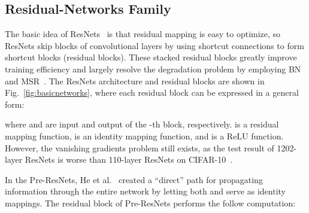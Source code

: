 \documentclass[journal]{IEEEtran}
\begin{document}
\subsection{Residual-Networks Family}
The basic idea of ResNets~\cite{he2015resnets} is that residual mapping is easy to optimize, so ResNets skip blocks of convolutional layers by using shortcut connections to form shortcut blocks (residual blocks). These stacked residual blocks greatly improve training efficiency and largely resolve the degradation problem by employing BN~\cite{ioffe2015bn} and MSR~\cite{he2015prelu}. The ResNets architecture and residual blocks are shown in Fig.~\ref{fig:basicnetworks}, where each residual block can be expressed in a general form:

where  and  are input and output of the -th block, respectively.  is a residual mapping function,  is an identity mapping function, and  is a ReLU function. However, the vanishing gradients problem still exists, as the test result of 1202-layer ResNets is worse than 110-layer ResNets on CIFAR-10~\cite{he2015resnets}. 
\par 
In the Pre-ResNets, He et al.~\cite{he2016preresnets} created a ``direct'' path for propagating information through the entire network by letting both  and  serve as identity mappings. The residual block of Pre-ResNets performs the follow computation:
\end{document}
